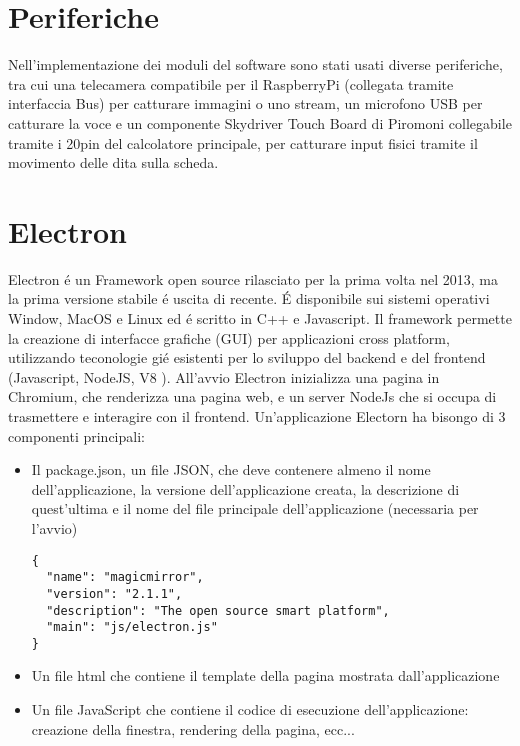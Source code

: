 \section{Periferiche}
Nell'implementazione dei moduli del software sono stati usati diverse periferiche, tra cui una telecamera
compatibile per il RaspberryPi (collegata tramite interfaccia Bus) per catturare immagini o uno stream,
un microfono USB per catturare la voce e un componente Skydriver Touch Board di Piromoni collegabile tramite
i 20pin del calcolatore principale, per catturare input fisici tramite il movimento delle dita sulla scheda.

\section{Electron}
Electron \'e un Framework open source rilasciato per la prima volta nel 2013, ma la prima versione
stabile \'e uscita di recente. \'E disponibile sui sistemi operativi Window, MacOS e Linux ed \'e scritto
in C++ e Javascript. Il framework permette la creazione di interfacce grafiche (GUI) per
applicazioni cross platform, utilizzando teconologie gi\'e esistenti per lo sviluppo del backend e del frontend
(Javascript, NodeJS, V8 \cite{V8}).
All'avvio Electron inizializza una pagina in Chromium, che renderizza una pagina web, e un server
NodeJs che si occupa di trasmettere e interagire con il frontend.
Un'applicazione Electorn ha bisongo di 3 componenti principali:
\begin{itemize}
\item Il package.json, un file JSON, che deve contenere almeno il nome dell'applicazione,
la versione dell'applicazione creata, la descrizione di quest'ultima e il
 nome del file principale dell'applicazione (necessaria per l'avvio)
\begin{lstlisting}
{
  "name": "magicmirror",
  "version": "2.1.1",
  "description": "The open source smart platform",
  "main": "js/electron.js"
}
\end{lstlisting}
\item Un file html che contiene il template della pagina mostrata dall'applicazione
\item Un file JavaScript che contiene il codice di esecuzione dell'applicazione: creazione della finestra,
rendering della pagina, ecc...
\end{itemize}

